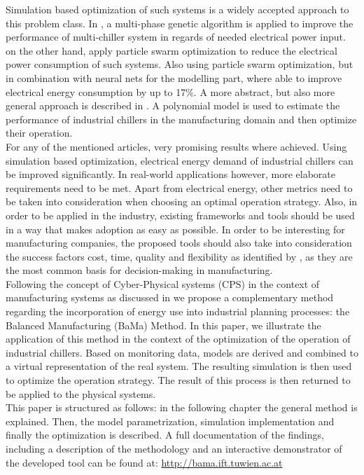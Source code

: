 \documentclass[3p,times,procedia,twocolumn,twoside]{elsarticle}
\begin{document}
Simulation based optimization of such systems is a widely accepted approach to this problem class. In \cite{Beghi2011}, a multi-phase genetic algorithm is applied to improve the performance of multi-chiller system in regards of needed electrical power input. \cite{Askarzadeh2015} on the other hand, apply particle swarm optimization to reduce the electrical power consumption of such systems. Also using particle swarm optimization, but in combination with neural nets for the modelling part, \cite{Chen2014} where able to improve electrical energy consumption by up to 17\%. A more abstract, but also more general approach is described in \cite{Munoz2017}. A polynomial model is used to estimate the performance of industrial chillers in the manufacturing domain and then optimize their operation.\\
For any of the mentioned articles, very promising results where achieved. Using simulation based optimization, electrical energy demand of industrial chillers can be improved significantly. In real-world applications however, more elaborate requirements need to be met. Apart from electrical energy, other metrics need to be taken into consideration when choosing an optimal operation strategy. Also, in order to be applied in the industry, existing frameworks and tools should be used in a way that makes adoption as easy as possible. In order to be interesting for manufacturing companies, the proposed tools should also take into consideration the success factors cost, time, quality and flexibility as identified by \cite{Chryssolouris1992}, as they are the most common basis for decision-making in manufacturing.\\
Following the concept of Cyber-Physical systems (CPS) in the context of manufacturing systems as discussed in \cite{Jazdi2014,Monostori2014} we propose a complementary method regarding the incorporation of energy use into industrial planning processes: the Balanced Manufacturing (BaMa) Method. In this paper, we illustrate the application of this method in the context of the optimization of the operation of industrial chillers. Based on monitoring data, models are derived and combined to a virtual representation of the real system. The resulting simulation is then used to optimize the operation strategy. The result of this process is then returned to be applied to the physical systems.\\
This paper is structured as follows: in the following chapter the general method is explained. Then, the model parametrization, simulation implementation and finally the optimization is described. A full documentation of the findings, including a description of the methodology and an interactive demonstrator of the developed tool can be found at: \url{http://bama.ift.tuwien.ac.at}
\end{document}
